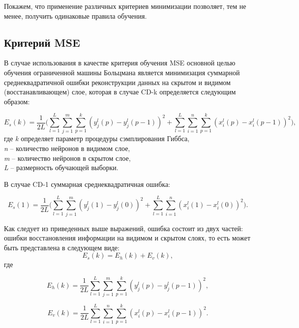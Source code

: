 Покажем, что применение различных критериев минимизации позволяет, тем не менее, получить одинаковые правила обучения.

\subsection{Критерий MSE}

В случае использования в качестве критерия обучения MSE основной целью обучения ограниченной машины Больцмана является минимизация суммарной среднеквадратичной ошибки реконструкции данных на скрытом и видимом (восстанавливающем) слое, которая в случае CD-k определяется следующим образом:	

\begin{equation*}	
    E_s(k)=\frac{1}{2L}\Bigg(\sum_{l=1}^L\sum_{j=1}^m\sum_{p=1}^k (y_j^l(p)-y_j^l(p-1))^2+\sum_{l=1}^L\sum_{i=1}^n\sum_{p=1}^k (x_i^l(p)-x_i^l(p-1))^2\Bigg),
\end{equation*}
где \textit{k} определяет параметр процедуры сэмплирования Гиббса,\\
\textit{n} -- количество нейронов в видимом слое,\\
\textit{m} -- количество нейронов в скрытом слое,\\
\textit{L} -- размерность обучающей выборки.

В случае CD-1  суммарная среднеквадратичная ошибка:

\begin{equation}
    E_s(1)=\frac{1}{2L}\Bigg(\sum_{l=1}^L\sum_{j=1}^m (y_j^l(1)-y_j^l(0))^2+\sum_{l=1}^L\sum_{i=1}^n (x_i^l(1)-x_i^l(0))^2\Bigg).
\end{equation}

Как следует из приведенных выше выражений, ошибка состоит из двух частей: ошибки восстановления информации на видимом и скрытом слоях, то есть может быть представлена в следующем виде:
\begin{equation}
	\label{mse_rbm_criteria}
	E_s(k) = E_h(k) + E_v(k),
\end{equation}
где

\begin{equation}
	E_h(k) = \frac{1}{2L}\sum_{l=1}^L\sum_{j=1}^m\sum_{p=1}^k (y_j^l(p)-y_j^l(p-1))^2,
\end{equation}

\begin{equation}
	E_v(k) = \frac{1}{2L}\sum_{l=1}^L\sum_{i=1}^n\sum_{p=1}^k (x_i^l(p)-x_i^l(p-1))^2.
\end{equation}

